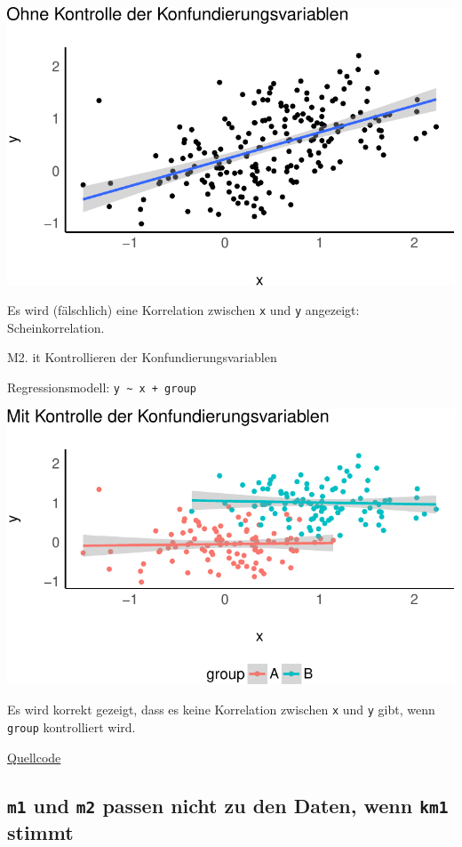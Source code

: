 \documentclass[
  a4paper,
  DIV=11]{scrreprt}
\theoremstyle{definition}
\theoremstyle{remark}
\begin{document}
\includegraphics{./kausal_files/figure-pdf/unnamed-chunk-4-1.pdf}

Es wird (fälschlich) eine Korrelation zwischen \texttt{x} und \texttt{y}
angezeigt: Scheinkorrelation.

M2. it Kontrollieren der Konfundierungsvariablen

Regressionsmodell: \texttt{y\ \textasciitilde{}\ x\ +\ group}

\includegraphics{./kausal_files/figure-pdf/plot-konf2-1.pdf}

Es wird korrekt gezeigt, dass es keine Korrelation zwischen \texttt{x}
und \texttt{y} gibt, wenn \texttt{group} kontrolliert wird.

\href{https://github.com/sebastiansauer/QM2-Folien/blob/main/Themen/children/Konfundierer-kontrollieren.Rmd}{Quellcode}

\hypertarget{m1-und-m2-passen-nicht-zu-den-daten-wenn-km1-stimmt}{%
\subsection{\texorpdfstring{\texttt{m1} und \texttt{m2} passen nicht zu
den Daten, wenn \texttt{km1}
stimmt}{m1 und m2 passen nicht zu den Daten, wenn km1 stimmt}}\label{m1-und-m2-passen-nicht-zu-den-daten-wenn-km1-stimmt}}
\end{document}

